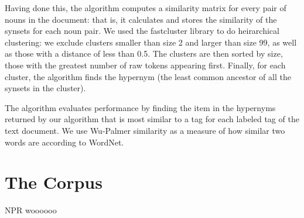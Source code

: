 \documentclass[11pt]{article}
\begin{document}
Having done this, the algorithm computes a similarity matrix for every pair of nouns in the document: that is, it calculates and stores the similarity of the synsets for each noun pair. We used the fastcluster library to do heirarchical clustering: we  exclude clusters smaller than size 2 and larger than size 99, as well as those with a distance of less than 0.5. The clusters are then sorted by size, those with the greatest number of raw tokens appearing first. Finally, for each cluster, the algorithm finds the hypernym (the least common ancestor of all the synsets in the cluster).

The algorithm evaluates performance by finding the item in the hypernyms returned by our algorithm that is most similar to a tag for each labeled tag of the text document. We use Wu-Palmer similarity as a measure of how similar two words are according to WordNet.

\section{The Corpus}

NPR woooooo

%
%


\end{document}
